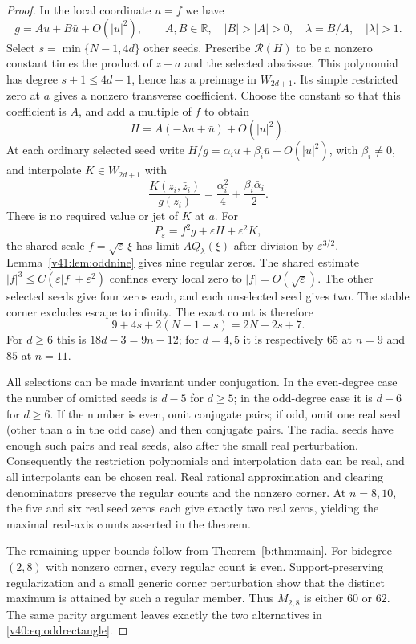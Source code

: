 \documentclass[UTF8,11pt]{ctexart}
\theoremstyle{definition}
\numberwithin{equation}{section}
\begin{document}
\begin{proof}
In the local coordinate $u=f$ we have
\[
              g=A u+B\bar u+O(|u|^2),\qquad
              A,B\in\mathbb R,\quad |B|>|A|>0,
              \quad\lambda=B/A,\quad |\lambda|>1.
\]
Select $s=\min\{N-1,4d\}$ other seeds. Prescribe
$\mathcal R(H)$ to be a nonzero constant times the product
of $z-a$ and the selected abscissae. This polynomial has
degree $s+1\le4d+1$, hence has a preimage in $W_{2d+1}$.
Its simple restricted zero at $a$ gives a nonzero
transverse coefficient. Choose the constant so that this
coefficient is $A$, and add a multiple of $f$ to obtain
\[
                         H=A(-\lambda u+\bar u)+O(|u|^2).
\]
At each ordinary selected seed write
$H/g=\alpha_i u+\beta_i\bar u+O(|u|^2)$, with
$\beta_i\ne0$, and interpolate $K\in W_{2d+1}$ with
\[
 \frac{K(z_i,\bar z_i)}{g(z_i)}=
                  \frac{\alpha_i^2}{4}+
                  \frac{\beta_i\bar\alpha_i}{2}.
\]
There is no required value or jet of $K$ at $a$.
For
\[
 P_\varepsilon=f^2g+\varepsilon H+\varepsilon^2K,
\]
the shared scale $f=\sqrt\varepsilon\,\xi$ has limit
$A Q_\lambda(\xi)$ after division by $\varepsilon^{3/2}$.
Lemma~\ref{v41:lem:oddnine} gives nine regular zeros.
The shared estimate
$|f|^3\le C(\varepsilon|f|+\varepsilon^2)$ confines
every local zero to $|f|=O(\sqrt\varepsilon)$.
The other selected seeds give four zeros each, and each
unselected seed gives two. The stable corner excludes
escape to infinity. The exact count is therefore
\[
                              9+4s+2(N-1-s)=2N+2s+7.
\]
For $d\ge6$ this is $18d-3=9n-12$; for $d=4,5$
it is respectively $65$ at $n=9$ and $85$ at $n=11$.

All selections can be made invariant under conjugation.
In the even-degree case the number of omitted seeds is
$d-5$ for $d\ge5$; in the odd-degree case it is $d-6$
for $d\ge6$. If the number is even, omit conjugate pairs;
if odd, omit one real seed (other than $a$ in the odd case)
and then conjugate pairs. The radial seeds have enough
such pairs and real seeds, also after the small real perturbation.
Consequently the restriction polynomials and interpolation data
can be real, and all interpolants can be chosen real.
Real rational approximation and clearing denominators preserve
the regular counts and the nonzero corner. At $n=8,10$, the
five and six real seed zeros each give exactly two real zeros,
yielding the maximal real-axis counts asserted in the theorem.

The remaining upper bounds follow from Theorem~\ref{b:thm:main}.
For bidegree $(2,8)$ with nonzero corner, every regular count
is even. Support-preserving regularization and a small generic
corner perturbation show that the distinct maximum is attained
by such a regular member. Thus $M_{2,8}$ is either $60$ or $62$. The same parity
argument leaves exactly the two alternatives in
\eqref{v40:eq:oddrectangle}.
\end{proof}
\end{document}
